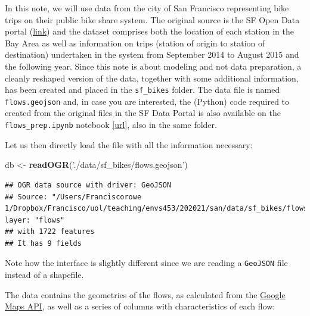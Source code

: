 \documentclass[
]{book}
\newenvironment{Shaded}{\begin{snugshade}}{\end{snugshade}}
\newcommand{\KeywordTok}[1]{\textcolor[rgb]{0.13,0.29,0.53}{\textbf{#1}}}
\newcommand{\NormalTok}[1]{#1}
\newcommand{\OperatorTok}[1]{\textcolor[rgb]{0.81,0.36,0.00}{\textbf{#1}}}
\newcommand{\OtherTok}[1]{\textcolor[rgb]{0.56,0.35,0.01}{#1}}
\newcommand{\StringTok}[1]{\textcolor[rgb]{0.31,0.60,0.02}{#1}}
\begin{document}
In this note, we will use data from the city of San Francisco representing bike trips on their public bike share system. The original source is the SF Open Data portal (\href{http://www.bayareabikeshare.com/open-data}{link}) and the dataset comprises both the location of each station in the Bay Area as well as information on trips (station of origin to station of destination) undertaken in the system from September 2014 to August 2015 and the following year. Since this note is about modeling and not data preparation, a cleanly reshaped version of the data, together with some additional information, has been created and placed in the \texttt{sf\_bikes} folder. The data file is named \texttt{flows.geojson} and, in case you are interested, the (Python) code required to created from the original files in the SF Data Portal is also available on the \texttt{flows\_prep.ipynb} notebook \href{https://github.com/darribas/spa_notes/blob/master/sf_bikes/flows_prep.ipynb}{{[}url{]}}, also in the same folder.

Let us then directly load the file with all the information necessary:

\begin{Shaded}
\begin{Highlighting}[]
\NormalTok{db <-}\StringTok{ }\KeywordTok{readOGR}\NormalTok{(}\StringTok{'./data/sf_bikes/flows.geojson'}\NormalTok{)}
\end{Highlighting}
\end{Shaded}

\begin{verbatim}
## OGR data source with driver: GeoJSON 
## Source: "/Users/Franciscorowe 1/Dropbox/Francisco/uol/teaching/envs453/202021/san/data/sf_bikes/flows.geojson", layer: "flows"
## with 1722 features
## It has 9 fields
\end{verbatim}

\begin{Shaded}
\end{Shaded}

Note how the interface is slightly different since we are reading a \texttt{GeoJSON} file instead of a shapefile.

The data contains the geometries of the flows, as calculated from the \href{https://developers.google.com/maps/}{Google Maps API}, as well as a series of columns with characteristics of each flow:
\end{document}
